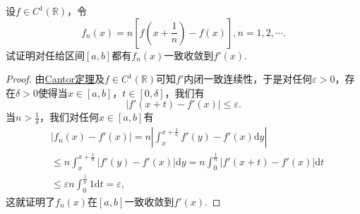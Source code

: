 \documentclass[../../main.tex]{subfiles}
\begin{document}
\begin{example}
设\(f \in C^1(\mathbb{R})\)，令
\[
f_n(x) = n \left[ f \left( x + \frac{1}{n} \right) - f(x) \right], n = 1, 2, \cdots.
\]
试证明对任给区间\([a, b]\)都有\(f_n(x)\)一致收敛到\(f'(x)\).
\end{example}
\begin{proof}
由\hyperref[theorem:Cantor定理]{Cantor定理}及\(f \in C^1(\mathbb{R})\)可知\(f'\)内闭一致连续性，于是对任何\(\varepsilon > 0\)，存在\(\delta > 0\)使得当\(x \in [a, b]\)，\(t \in [0, \delta]\)，我们有
\[
|f'(x + t) - f'(x)| \leqslant \varepsilon.
\]
当\(n > \frac{1}{\delta}\)，我们对任何\(x \in [a, b]\)有
\begin{align*}
&|f_n(x) - f'(x)| = n \left| \int_{x}^{x + \frac{1}{n}} f'(y) - f'(x) \mathrm{d}y \right| \\
&\leqslant n \int_{x}^{x + \frac{1}{n}} |f'(y) - f'(x)| \mathrm{d}y = n \int_{0}^{\frac{1}{n}} |f'(x + t) - f'(x)| \mathrm{d}t \\
&\leqslant \varepsilon n \int_{0}^{\frac{1}{n}} 1 \mathrm{d}t = \varepsilon,
\end{align*}
这就证明了\(f_n(x)\)在\([a, b]\)一致收敛到\(f'(x)\).
\end{proof}
\end{document}
